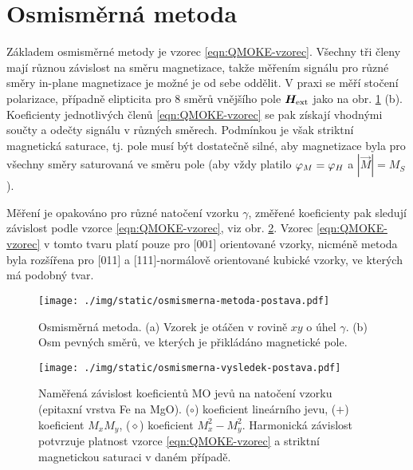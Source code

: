 \section{Osmisměrná metoda}
\label{chap:osmismerna-metoda}

Základem osmisměrné metody\cite{postavaAnisotropyQuadraticMagnetooptic2002} je vzorec \eqref{eqn:QMOKE-vzorec}.
Všechny tři členy mají různou závislost na směru magnetizace, takže měřením signálu pro různé směry in-plane magnetizace je možné je od sebe oddělit.
V praxi se měří stočení polarizace, případně elipticita pro 8 směrů vnějšího pole $\bm{H}_\textrm{ext}$ jako na obr. \ref{fig:osmismerna-metoda} (b).
Koeficienty jednotlivých členů \eqref{eqn:QMOKE-vzorec} se pak získají vhodnými součty a odečty signálu v různých směrech.
Podmínkou je však striktní magnetická saturace, tj. pole musí být dostatečně silné, aby magnetizace byla pro všechny směry saturovaná ve směru pole (aby vždy platilo $\varphi_M=\varphi_H$ a $|\vec{M}|=M_S$).

Měření je opakováno pro různé natočení vzorku $\gamma$, změřené koeficienty pak sledují závislost podle vzorce \eqref{eqn:QMOKE-vzorec}, viz obr. \ref{fig:osmismerna-vysledky}.
Vzorec \eqref{eqn:QMOKE-vzorec} v tomto tvaru platí pouze pro [001] orientované vzorky, nicméně metoda byla rozšířena pro [011] a [111]-normálově orientované kubické vzorky, ve kterých má podobný tvar\cite{silberQuadraticMagnetoopticKerr2019a,hamrlovaQuadraticinmagnetizationPermittivityConductivity2013}.

\begin{figure}[htbp]
    \centering
    \texttt{[image: ./img/static/osmismerna-metoda-postava.pdf]}
    \caption{Osmisměrná metoda. (a) Vzorek je otáčen v rovině $xy$ o úhel $\gamma$. (b) Osm pevných směrů, ve kterých je přikládáno magnetické pole. \cite{postavaAnisotropyQuadraticMagnetooptic2002}}
    \label{fig:osmismerna-metoda}
\end{figure}

\begin{figure}[htbp]
    \centering
    \texttt{[image: ./img/static/osmismerna-vysledek-postava.pdf]}
    \caption{Naměřená závislost koeficientů MO jevů na natočení vzorku (epitaxní vrstva Fe na MgO). ($\circ$) koeficient lineárního jevu, ($+$) koeficient $M_xM_y$, ($\diamond$) koeficient $M_x^2-M_y^2$. Harmonická závislost potvrzuje platnost vzorce \eqref{eqn:QMOKE-vzorec} a striktní magnetickou saturaci v daném případě. \cite{postavaAnisotropyQuadraticMagnetooptic2002}}
    \label{fig:osmismerna-vysledky}
\end{figure}
